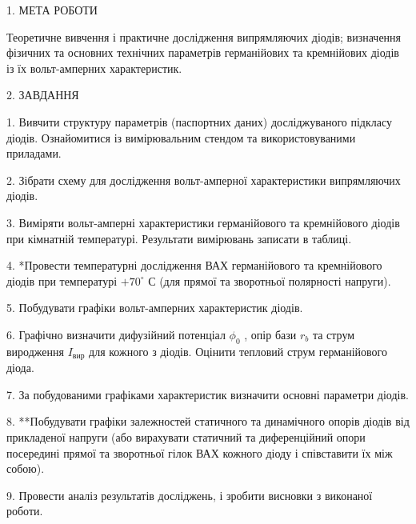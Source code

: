 \documentclass[a4paper,14pt]{extreport}
\begin{document}
\begin{center}1. МЕТА РОБОТИ\\ \end{center}

Теоретичне вивчення і практичне дослідження випрямляючих діодів; визначення фізичних та основних технічних параметрів германійових та кремнійових діодів із їх вольт-амперних характеристик.\\

\begin{center}2. ЗАВДАННЯ\\ \end{center}

1. Вивчити структуру параметрів (паспортних даних) досліджуваного підкласу діодів.
Ознайомитися із вимірювальним стендом та використовуваними приладами.\par
2. Зібрати схему для дослідження вольт-амперної характеристики випрямляючих діодів.\par
3. Виміряти вольт-амперні характеристики германійового та кремнійового діодів при
кімнатній температурі. Результати вимірювань записати в таблиці.\par
4. *Провести температурні дослідження ВАХ германійового та кремнійового діодів при
температурі $+70^\circ$ С (для прямої та зворотньої полярності напруги).\par
5. Побудувати графіки вольт-амперних характеристик діодів.\par
6. Графічно визначити дифузійний потенціал $\phi_0$ , опір бази $r_b$ та струм виродження $I_\text{вир}$ для
кожного з діодів. Оцінити тепловий струм германійового діода.\par
7. За побудованими графіками характеристик визначити основні параметри діодів.\par
8. **Побудувати графіки залежностей статичного та динамічного опорів діодів від
прикладеної напруги (або вирахувати статичний та диференційний опори посередині прямої та
зворотньої гілок ВАХ кожного діоду і співставити їх між собою).\par
9. Провести аналіз результатів досліджень, і зробити висновки з виконаної роботи.
\newpage
\end{document}
